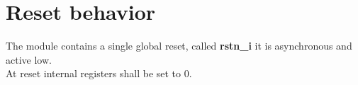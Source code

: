 \section{Reset behavior}

The module contains a single global reset, called \textbf{rstn\_i} it is asynchronous and active low.\\
At reset internal registers shall be set to 0.




